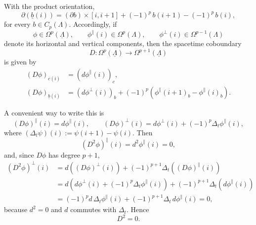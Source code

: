With the product orientation,
\begin{equation}
	\partial\left(\underline b(i)\right)
	=
	(\partial b)\times[i,i+1]
	+(-1)^p\,b(i+1)-(-1)^p\,b(i),
	\label{eq:product-boundary}
\end{equation}
for every \(b\in C_p(\Lambda)\). Accordingly, if
\begin{equation}
	\phi\in \Omega^p(\underline\Lambda),
	\qquad
	\phi^\parallel(i)\in \Omega^p(\Lambda),
	\qquad
	\phi^\perp(i)\in \Omega^{p-1}(\Lambda)
\end{equation}
denote its horizontal and vertical components, then the spacetime coboundary
\begin{equation}
	D:\Omega^p(\underline\Lambda)\to \Omega^{p+1}(\underline\Lambda)
\end{equation}
is given by
\begin{subequations}
	\begin{align}
		(D\phi)_{c(i)}
		&=
		\left(d\phi^\parallel(i)\right)_c,
		\label{eq:D-horizontal-components}
		\\
		(D\phi)_{\underline b(i)}
		&=
		\left(d\phi^\perp(i)\right)_b
		+
		(-1)^p\left(\phi^\parallel(i+1)_b-\phi^\parallel(i)_b\right).
		\label{eq:D-vertical-components}
	\end{align}
	\label{eq:D-components}
\end{subequations}

A convenient way to write this is
\begin{equation}
	(D\phi)^\parallel(i)=d\phi^\parallel(i),
	\qquad
	(D\phi)^\perp(i)=d\phi^\perp(i)+(-1)^p\Delta_t\phi^\parallel(i),
\end{equation}
where \((\Delta_t\psi)(i):=\psi(i+1)-\psi(i)\). Then
\begin{equation}
	(D^2\phi)^\parallel(i)=d^2\phi^\parallel(i)=0,
\end{equation}
and, since \(D\phi\) has degree \(p+1\),
\begin{align*}
	(D^2\phi)^\perp(i)
	&=
	d\left((D\phi)^\perp(i)\right)+(-1)^{p+1}\Delta_t\left((D\phi)^\parallel(i)\right)\\
	&=
	d\left(d\phi^\perp(i)+(-1)^p\Delta_t\phi^\parallel(i)\right)
	+(-1)^{p+1}\Delta_t\left(d\phi^\parallel(i)\right)\\
	&=
	(-1)^p d\,\Delta_t\phi^\parallel(i)+(-1)^{p+1}\Delta_t\,d\phi^\parallel(i)=0,
\end{align*}
because \(d^2=0\) and \(d\) commutes with \(\Delta_t\). Hence
\begin{equation}
	D^2=0.
	\label{eq:D2-zero}
\end{equation}

